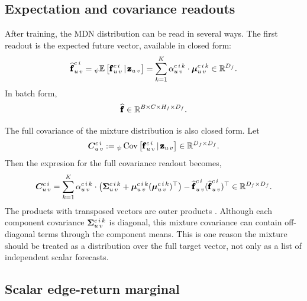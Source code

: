 \newpage{}
\subsection{Expectation and covariance readouts}
\label{subsec:mdn-expectation-and-covariance}

After training, the MDN distribution can be read in several ways.  The first
readout is the expected future vector, available in closed form:
\[
  \widehat{\pmb{\mathbf{f}}}_{u\,v}^{c\,i}
  =
  {}_{\psi}\mathbb{E}
  \left[
    \pmb{\mathbf{f}}_{u\,v}^{c\,i}\,\vert\,\pmb{\mathbf{z}}_{u\,v}
  \right]
  =
  \sum_{k=1}^{K}
  \alpha_{u\,v}^{c\,i\,k}\cdot
  \bm{\mu}_{u\,v}^{c\,i\,k}
  \in\mathbb{R}^{D_f}.
\]
In batch form,
\[
  \widehat{\pmb{\mathbf{f}}}
  \in
  \mathbb{R}^{B\times C\times H_f\times D_f}.
\]

The full covariance of the mixture distribution is also closed form.  Let
\[
  \bm{C}_{u\,v}^{c\,i}
  :=
  {}_{\psi}\operatorname{Cov}
  \left[
    \pmb{\mathbf{f}}_{u\,v}^{c\,i}
    \,\vert\,
    \pmb{\mathbf{z}}_{u\,v}
  \right]
  \in\mathbb{R}^{D_f\times D_f}.
\]
Then the expresion for the full covariance readout becomes,
\[
  \bm{C}_{u\,v}^{c\,i}
  =
  \sum_{k=1}^{K}
  \alpha_{u\,v}^{c\,i\,k}\cdot
  \left(
    \bm{\Sigma}_{u\,v}^{c\,i\,k}
    +
    \bm{\mu}_{u\,v}^{c\,i\,k}
    (\bm{\mu}_{u\,v}^{c\,i\,k})^{\top}
  \right)
  -
  \widehat{\pmb{\mathbf{f}}}_{u\,v}^{c\,i}
  (\widehat{\pmb{\mathbf{f}}}_{u\,v}^{c\,i})^{\top}
  \in\mathbb{R}^{D_f\times D_f}.
\]
The products with transposed vectors are outer products%
. Although each component covariance $\bm{\Sigma}_{u\,v}^{c\,i\,k}$ is diagonal,
this mixture covariance can contain off-diagonal terms through the component
means.  This is one reason the mixture should be treated as a distribution over
the full target vector, not only as a list of independent scalar forecasts.




\subsection{Scalar edge-return marginal}
\label{subsec:mdn-scalar-edge-return-marginal}


